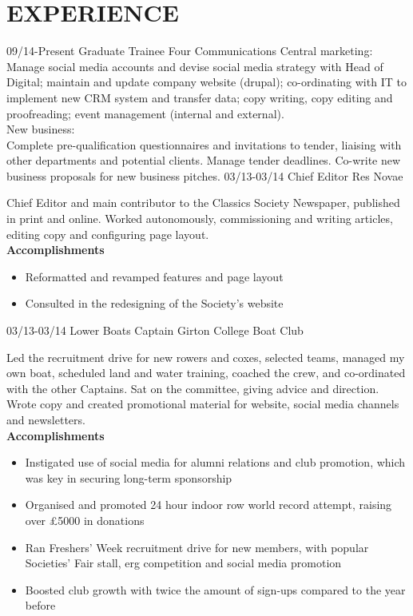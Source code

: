 \documentclass[]{friggeri-cv}
\begin{document}
\section{EXPERIENCE}

\begin{entrylist}
  \entry
  {09/14-Present}
  {Graduate Trainee}
  {Four Communications}
  {Central marketing:\\
  	Manage social media accounts and devise social media strategy with Head of Digital; maintain and update company website (drupal); co-ordinating with IT to implement new CRM system and transfer data; copy writing, copy editing and proofreading; event management (internal and external).\\
  	
  	New business:\\
  	Complete pre-qualification questionnaires and invitations to tender, liaising with other departments and potential clients. Manage tender deadlines. Co-write new business proposals for new business pitches.}
  \entry
    {03/13-03/14}
    {Chief Editor}
    {Res Novae}
    {Chief Editor and main contributor to the Classics Society Newspaper, published in print and online. Worked autonomously, commissioning and writing articles, editing copy and configuring page layout. \\
    \textbf{Accomplishments}
    \begin{itemize}
    	\item Reformatted and revamped features and page layout
    	\item Consulted in the redesigning of the Society's website
    \end{itemize}
    }    
  \entry
  {03/13-03/14}
  {Lower Boats Captain}
  {Girton College Boat Club}
  {Led the recruitment drive for new rowers and coxes, selected teams, managed my own boat, scheduled land and water training, coached the crew, and co-ordinated with the other Captains. Sat on the committee, giving advice and direction. Wrote copy and created promotional material for website, social media channels and newsletters. \\
  	\textbf{Accomplishments}
  	\begin{itemize}
  		\item Instigated use of social media for alumni relations and club promotion, which was key in securing long-term sponsorship
  		\item Organised and promoted 24 hour indoor row world record attempt, raising over £5000 in donations
  		\item Ran Freshers' Week recruitment drive for new members, with popular Societies' Fair stall, erg competition and social media promotion
  		\item Boosted club growth with twice the amount of sign-ups compared to the year before
  	\end{itemize}
  }
  \end{entrylist}
\end{document}
